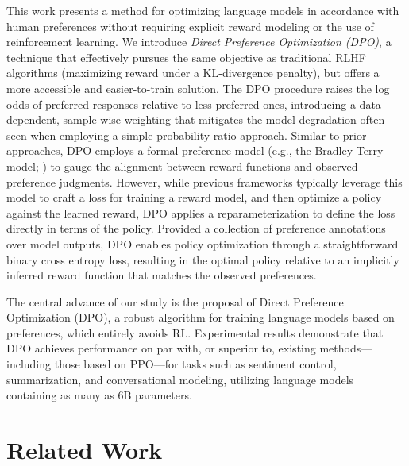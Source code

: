 This work presents a method for optimizing language models in accordance with human preferences without requiring explicit reward modeling or the use of reinforcement learning. We introduce \textit{{Direct Preference Optimization} (DPO)}, a technique that effectively pursues the same objective as traditional RLHF algorithms (maximizing reward under a KL-divergence penalty), but offers a more accessible and easier-to-train solution. The DPO procedure raises the log odds of preferred responses relative to less-preferred ones, introducing a data-dependent, sample-wise weighting that mitigates the model degradation often seen when employing a simple probability ratio approach. Similar to prior approaches, DPO employs a formal preference model (e.g., the Bradley-Terry model; \cite{bradley1952rankanalysis}) to gauge the alignment between reward functions and observed preference judgments. However, while previous frameworks typically leverage this model to craft a loss for training a reward model, and then optimize a policy against the learned reward, DPO applies a reparameterization to define the loss directly in terms of the policy. Provided a collection of preference annotations over model outputs, DPO enables policy optimization through a straightforward binary cross entropy loss, resulting in the optimal policy relative to an implicitly inferred reward function that matches the observed preferences.

The central advance of our study is the proposal of Direct Preference Optimization (DPO), a robust algorithm for training language models based on preferences, which entirely avoids RL. Experimental results demonstrate that DPO achieves performance on par with, or superior to, existing methods—including those based on PPO—for tasks such as sentiment control, summarization, and conversational modeling, utilizing language models containing as many as 6B parameters.

\section{Related Work}

